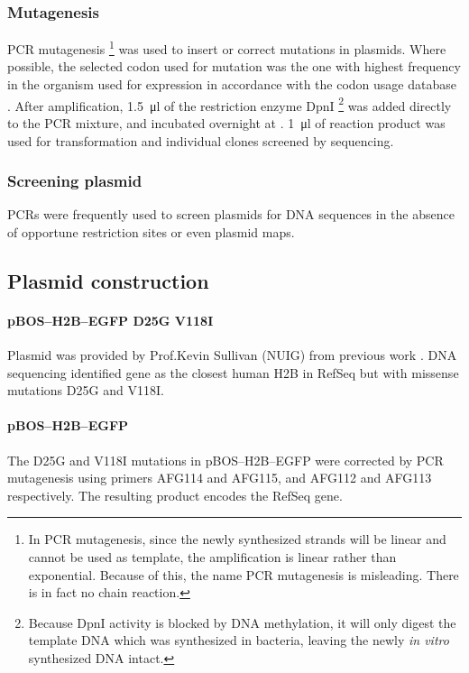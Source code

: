       \subsubsection{Mutagenesis}
        PCR mutagenesis
        \footnote{
          In PCR mutagenesis, since the newly synthesized strands will
          be linear and cannot be used as template, the amplification
          is linear rather than exponential. Because of this, the name
          PCR mutagenesis is misleading. There is in fact no chain reaction.
        }
        was used to insert or correct mutations in plasmids.
        Where possible, the selected codon used for mutation was the one
        with highest frequency in the organism used for expression
        in accordance with the
        codon usage database \citep{codon_usage}. After amplification,
        \SI{1.5}{\ul} of the restriction enzyme DpnI
        \footnote{
          Because DpnI activity is blocked by DNA methylation, it will
          only digest the template DNA which was synthesized in bacteria,
          leaving the newly \textit{in vitro} synthesized DNA intact.
        }
        was added directly to the PCR mixture, and incubated overnight at
        . \SI{1}{\ul} of reaction product
        was used for transformation and individual
        clones screened by sequencing.

      \subsubsection{Screening plasmid}
        PCRs were frequently used to screen plasmids for DNA sequences
        in the absence of opportune restriction sites or even plasmid maps.

    \subsection{Plasmid construction}

      \paragraph{pBOS--H2B--EGFP D25G V118I}
      Plasmid was provided by Prof.\@ Kevin Sullivan (NUIG) from
      previous work \citep{KevinH2BGFP}.  DNA sequencing identified
      gene  as the closest human H2B in RefSeq but
      with missense mutations D25G and V118I.

      \paragraph{pBOS--H2B--EGFP}
      The D25G and V118I mutations in pBOS--H2B--EGFP were corrected
      by PCR mutagenesis using primers AFG114 and AFG115, and AFG112
      and AFG113 respectively.  The resulting product encodes the
       RefSeq gene.

